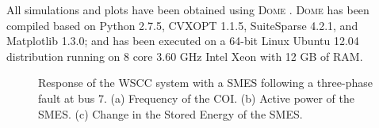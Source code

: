 \documentclass[journal, a4paper]{IEEEtran}
\begin{document}
All simulations and plots have been obtained using \textsc{Dome}
\cite{Vancouver}.  \textsc{Dome} has been compiled based on Python
2.7.5, CVXOPT 1.1.5, SuiteSparse 4.2.1, and Matplotlib 1.3.0; and has
been executed on a 64-bit Linux Ubuntu 12.04 distribution running on 8
core 3.60 GHz Intel Xeon with 12 GB of RAM.

\vspace{-2mm}


\begin{figure}[t!]
  \centering
  \vspace{-2.5mm}
  \caption{Response of the WSCC system with a SMES following a three-phase
    fault at bus 7.  (a) Frequency of the COI.  (b) Active power
    of the SMES. (c) Change in the Stored Energy of the SMES.}
  	\label{SMES_noSat}
\vspace{-0.4cm}
\end{figure}
\end{document}
